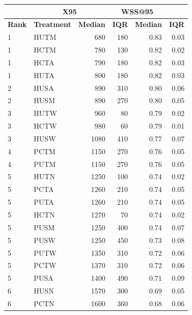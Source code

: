 \documentclass{svjour3}
\theoremstyle{break}
\begin{document}
\begin{table}
\begin{center}
\parbox{.49\linewidth}{
\centering
{\scriptsize \begin{tabular}{l@{~~~}l@{~~~}r@{~~~}r@{~~~}r@{~~~}r}
\arrayrulecolor{lightgray}
\multicolumn{2}{l}{\textbf{Radjenovi{\'c}}}  & \multicolumn{2}{c}{\textbf{X95}} & \multicolumn{2}{c}{\textbf{WSS@95}}\\\hline
\textbf{Rank} & \textbf{Treatment} & \textbf{Median} & \textbf{IQR} & \textbf{Median} & \textbf{IQR} \\\hline
\rowcolor{green!40}
  1 &         HUTM &    680   &  180  & 0.83 & 0.03 \\
  1 &         HCTM &    780   &  130  & 0.82 & 0.02 \\
  1 &         HCTA &    790   &  180  & 0.82 & 0.03 \\
  1 &         HUTA &    800   &  180  & 0.82 & 0.03 \\
\hline  2 &         HUSA &    890   &  310  & 0.80 & 0.06 \\
  2 &         HUSM &    890   &  270  & 0.80 & 0.05 \\
\hline  3 &         HUTW &    960   &  80  & 0.79 & 0.02 \\
  3 &         HCTW &    980   &  60  & 0.79 & 0.01 \\
  3 &         HUSW &    1080   &  410  & 0.77 & 0.07 \\
\hline  4 &         PCTM &    1150   &  270  & 0.76 & 0.05 \\
  4 &         PUTM &    1150   &  270  & 0.76 & 0.05 \\
\hline  5 &         HUTN &    1250   &  100  &  0.74 & 0.02 \\
  5 &         PCTA &    1260   &  210  & 0.74 & 0.05 \\
  5 &         PUTA &    1260   &  210  & 0.74 & 0.05 \\
  \rowcolor{red!30}
  5 &         HCTN &    1270   &  70  & 0.74 & 0.02 \\
  5 &         PUSM &    1250   &  400  & 0.74 & 0.07 \\
  5 &         PUSW &    1250   &  450  & 0.73 & 0.08 \\
  5 &         PUTW &    1350   &  310  & 0.72 & 0.06 \\
\rowcolor{red!30}
  5 &         PCTW &    1370   &  310  & 0.72 & 0.06 \\
  \rowcolor{red!30}
  5 &         PUSA &    1400   &  490  & 0.71 & 0.09 \\
\hline  6 &         HUSN &    1570   &  300  & 0.69 & 0.05 \\
  6 &         PCTN &    1600   &  360  & 0.68 & 0.06 \\

\end{tabular}}}
\end{center}
\end{table}
\end{document}
